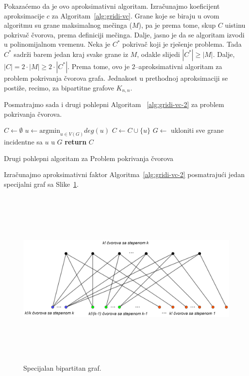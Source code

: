 \documentclass[a4paper, utf8, 11pt, colorlinks]{book}
\theoremstyle{definition}
\begin{document}
  \noindent Pokazaćemo da je ovo aproksimativni algoritam. Izračunajmo koeficijent aproksimacije $c$ za Algoritam~\ref{alg:gridi-vc}.
  Grane koje se biraju u ovom algoritmu su grane maksimalnog mečinga ($M$), pa je prema tome, skup $C$ uistinu pokrivač čvorova, prema definiciji mečinga. Dalje, jasno je da se algoritam izvodi u polinomijalnom vremenu. Neka je $C^*$ pokrivač koji je rješenje problema. Tada $C^*$ sadrži barem jedan kraj svake grane iz $M$, odakle slijedi $|C^*|\geq |M|$. Dalje, $|C|= 2 \cdot |M| \geq 2 \cdot |C^*|$. Prema tome, ovo je $2$--aproksimativni algoritam za problem pokrivanja čvorova grafa. Jednakost u prethodnoj aproksimaciji se postiže, recimo, za bipartitne grafove $K_{n,n}$. 
 
  
  Posmatrajmo sada i drugi pohlepni Algoritam ~\ref{alg:gridi-vc-2} za problem pokrivanja čvorova.  
  
  \begin{algorithm}[H] 
  	\begin{algorithmic}[1]
  		\STATE $C \gets \emptyset$
  		\STATE  $u \gets \textrm{argmin}_{u \in V(G)} deg(u)$
  		\STATE  $C \gets C \cup \{u\}$
  		\STATE $G \gets$ ukloniti sve grane incidentne sa $u$ u $G$  
  		\ENDWHILE
  		\STATE \textbf{return} $C$
  	\end{algorithmic}
     	\caption{Drugi pohlepni algoritam za Problem pokrivanja čvorova}
        \label{alg:gridi-vc-2}
  \end{algorithm}
  
  \noindent Izračunajmo aproksimativni faktor Algoritma~\ref{alg:gridi-vc-2} posmatrajući jedan specijalni graf sa Slike~\ref{vertex-coverEx}. 
  
  
  \begin{figure}
  	\centering
  	\includegraphics[width=140mm,height=90mm]{vc-2-example.eps}
  	\caption{Specijalan bipartitan graf.} 
  	\label{vertex-coverEx}
  \end{figure}
  
\end{document}
